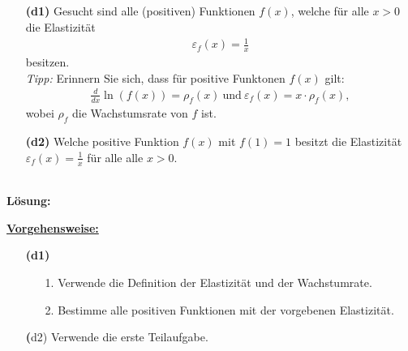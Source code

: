 \subsection*{}
\begin{enumerate}
	\item[\textbf{(d1)}]
	Gesucht sind alle (positiven) Funktionen $ f(x) $, welche für alle $ x > 0 $ die Elastizität
	\begin{align*}
		\varepsilon_f(x) = \frac{1}{x}
	\end{align*}
	besitzen.\\
	\textit{Tipp:} Erinnern Sie sich, dass für positive Funktonen $ f(x) $ gilt:
	\begin{align*}
		\frac{d}{dx} \ln(f(x)) = \rho_f(x) 
		\ \textrm{und} \
		\varepsilon_f(x) = x \cdot \rho_f(x),
	\end{align*}
	wobei $ \rho_f $ die Wachstumsrate von $ f $ ist.
	\item[\textbf{(d2)}]
	Welche positive Funktion $ f(x) $ mit $ f(1) = 1 $ besitzt die Elastizität $ \varepsilon_f(x) = \frac{1}{x} $ für alle alle $ x >0 $.
\end{enumerate}
\ \\
\textbf{Lösung:}
\begin{mdframed}
\underline{\textbf{Vorgehensweise:}}
\begin{enumerate}
\item[\textbf{(d1)}]
\begin{enumerate}
	\item[1.] Verwende die Definition der Elastizität und der Wachstumrate.
	\item[2.] 
	Bestimme alle positiven Funktionen mit der vorgebenen Elastizität.
\end{enumerate}
\item[\textbf(d2)] 
Verwende die erste Teilaufgabe.
\end{enumerate}
\end{mdframed}

